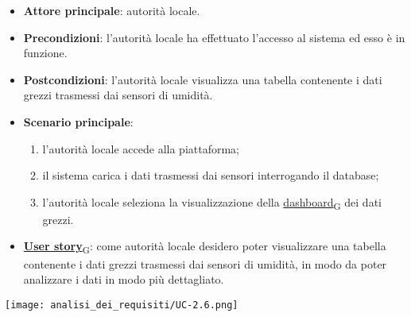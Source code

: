 \begin{itemize}
	\item \textbf{Attore principale}: autorità locale.
	\item \textbf{Precondizioni}: l'autorità locale ha effettuato l'accesso al sistema ed esso è in funzione.
	\item \textbf{Postcondizioni}: l'autorità locale visualizza una tabella contenente i dati grezzi trasmessi dai sensori di umidità.
	\item \textbf{Scenario principale}:
	      \begin{enumerate}
		      \item l'autorità locale accede alla piattaforma;
		      \item il sistema carica i dati trasmessi dai sensori interrogando il database;
		      \item l'autorità locale seleziona la visualizzazione della \href{https://7last.github.io/docs/rtb/documentazione-interna/glossario\#dashboard}{dashboard\textsubscript{G}} dei dati grezzi.
	      \end{enumerate}
	\item \href{https://7last.github.io/docs/rtb/documentazione-interna/glossario\#user-story}{\textbf{User story}\textsubscript{G}}:
	      come autorità locale desidero poter visualizzare una tabella contenente i dati grezzi trasmessi dai sensori di umidità,
	      in modo da poter analizzare i dati in modo più dettagliato.
\end{itemize}
\begin{center}
	\texttt{[image: analisi\_dei\_requisiti/UC-2.6.png]}
\end{center}
\newpage
{}
